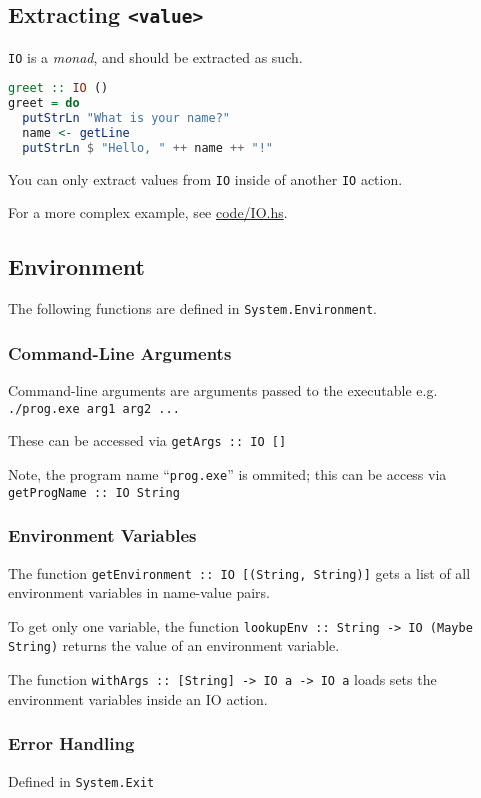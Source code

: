 \subsection{Extracting \texttt{<value>}}
\texttt{IO} is a \textit{monad}, and should be extracted as such.
\begin{lstlisting}[language=haskell]
greet :: IO ()
greet = do
  putStrLn "What is your name?"
  name <- getLine
  putStrLn $ "Hello, " ++ name ++ "!"
\end{lstlisting}

You can only extract values from \texttt{IO} inside of another \texttt{IO} action.

For a more complex example, see \url{code/IO.hs}.

\subsection{Environment}
The following functions are defined in \texttt{System.Environment}.

\subsubsection{Command-Line Arguments}
Command-line arguments are arguments passed to the executable e.g. \texttt{./prog.exe arg1 arg2 ...}

These can be accessed via \texttt{getArgs :: IO []}

Note, the program name ``\texttt{prog.exe}'' is ommited; this can be access via \texttt{getProgName :: IO String}

\subsubsection{Environment Variables}
The function \texttt{getEnvironment :: IO [(String, String)]} gets a list of all environment variables in name-value pairs.

To get only one variable, the function \texttt{lookupEnv :: String -> IO (Maybe String)} returns the value of an environment variable.

The function \texttt{withArgs :: [String] -> IO a -> IO a} loads sets the environment variables inside an IO action.

\subsubsection{Error Handling}
Defined in \texttt{System.Exit}

